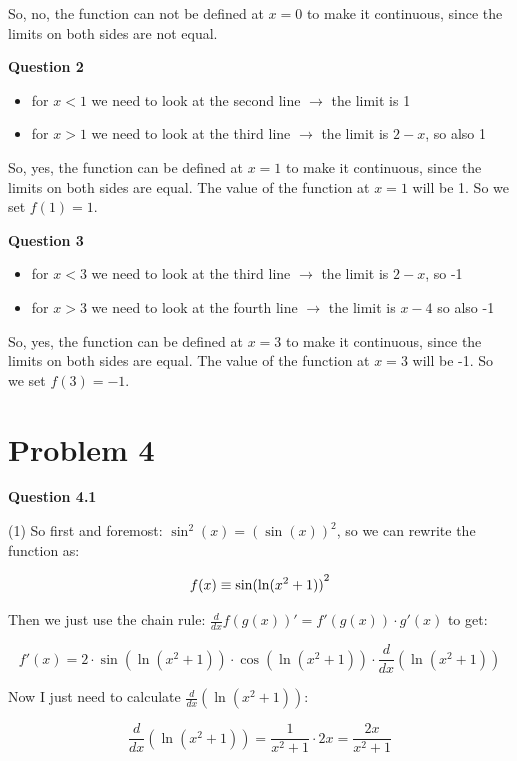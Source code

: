 \documentclass[11pt, a4paper]{article}
\begin{document}
So, no, the function can not be defined at $x = 0$ to make it continuous, since the limits on both sides are not equal.

\textbf{Question 2}

\begin{itemize}
	\item for $x < 1$ we need to look at the second line $\rightarrow$ the limit is 1
	\item for $x > 1$ we need to look at the third line $\rightarrow$ the limit is $2 - x$, so also 1
\end{itemize}

So, yes, the function can be defined at $x = 1$ to make it continuous, since the limits on both sides are equal. The value of the function at $x = 1$ will be 1.
So we set $f(1) = 1$.

\textbf{Question 3}

\begin{itemize}
	\item for $x < 3$ we need to look at the third line $\rightarrow$ the limit is $2 - x$, so -1
	\item for $x > 3$ we need to look at the fourth line $\rightarrow$ the limit is $x - 4$ so also -1
\end{itemize}

So, yes, the function can be defined at $x = 3$ to make it continuous, since the limits on both sides are equal. The value of the function at $x = 3$ will be -1.
So we set $f(3) = -1$.


\pagebreak
\section*{Problem 4}

\textbf{Question 4.1}

(1) So first and foremost: $\sin^2(x) = {(\sin(x))}^2$, so we can rewrite the function as:

\[
f(x) \equiv {\sin(\ln(x^2+1))}^2 \\
\]

Then we just use the chain rule: $\frac{d}{dx} f(g(x))' = f'(g(x)) \cdot g'(x)$ to get:

\[
f'(x) = 2 \cdot \sin(\ln(x^2+1)) \cdot \cos(\ln(x^2+1)) \cdot \frac{d}{dx}(\ln(x^2+1))
\]

Now I just need to calculate $\frac{d}{dx}(\ln(x^2+1))$:

\[
\frac{d}{dx}(\ln(x^2+1)) = \frac{1}{x^2+1} \cdot 2x = \frac{2x}{x^2+1}
\]
\end{document}
